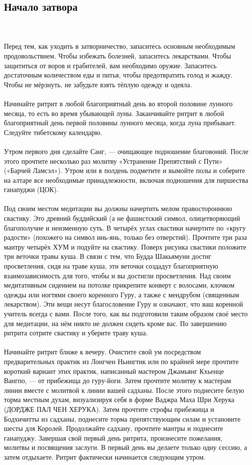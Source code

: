 \subsection{Начало затвора}
\\ \\ Перед тем, как уходить в затворничество, запаситесь основным необходимым продовольствием. Чтобы избежать болезней, запаситесь лекарствами. Чтобы защититься от воров и грабителей, вам необходимо оружие. Запаситесь достаточным количеством еды и питья, чтобы предотвратить голод и жажду. Чтобы не мёрзнуть, не забудьте взять тёплую одежду и одеяла.
\\ \\ Начинайте ритрит в любой благоприятный день во второй половине лунного месяца, то есть во время убывающей луны. Заканчивайте ритрит в любой благоприятный день первой половины лунного месяца, когда луна прибывает. Следуйте тибетскому календарю.
\\ \\ Утром первого дня сделайте Санг, — очищающее подношение благовоний. После этого прочтите несколько раз молитву «Устранение Препятствий с Пути» («Барчей Ламсэл»). Утром или в полдень подметите и вымойте полы и соберите на алтаре все необходимые принадлежности, включая подношения для пиршества ганапуджи (ЦОК).
\\ \\ Под своим местом медитации вы должны начертить мелом правостороннюю свастику. Это древний буддийский (а не фашистский символ, олицетворяющий благополучие и неизменную суть. В четырёх углах свастики начертите по «кругу радости» (похожего на символ инь-янь, только без отверстий). Прочтите три раза мантру четырёх ХУМ и подуйте на свастику. Поверх рисунка свастики положите три веточки травы куша. В связи с тем, что Будда Шакьямуни достиг просветления, сидя на траве куша, эти веточки создадут благоприятную взаимозависимость для того, чтобы и вы достигли просветле\-ния. Над своим медитативным сидением на потолке прикрепи\-те конверт с волосами, клочком одежды или ногтями своего коренного Гуру, а также с мендрубом (священным лекарством). Эти вещи несут благословение Гуру и означают, что ваш коренной учитель всегда с вами. После того, как вы подготови\-ли таким образом своё место для медитации, на нём никто не должен сидеть кроме вас. По завершению ритрита сотрите свастику и уберите траву куша.
\\ \\ Начинайте ритрит ближе к вечеру. Очистите свой ум посредством предварительных практик из Лонгчен Ньингтик или по крайней мере прочтите короткий вариант этих практик, написанный мастером Джамьянг Кхьенце Вангпо, — от прибежища до гуру-йоги. Затем прочтите молитву к мастерам линии вместе с молитвой к линии вашей садханы. После этого поднесите белую торма местным духам, визуализируя себя в форме Ваджра Маха Шри Херука (ДОРДЖЕ ПАЛ ЧЕН ХЕРУКА). Затем прочтите строфы прибежища и Бодхичитты из садханы, поднесите торма препятствующим силам и установите шесты для Королей. Продолжайте садхану, прочтите мантры и поднесите ганапуджу. Завершая свой первый день ритрита, произнесите пожелания, молитвы и посвящения заслуги. В первый день вы делаете только одну сессию, а затем отдыхаете. Ритрит фактически начинается следующим утром.
